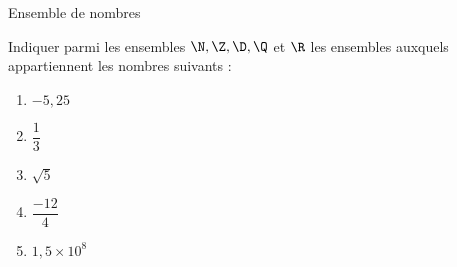 \documentclass[french,onlymath]{beamer}
\begin{document}
\begin{frame}{Ensemble de nombres}

Indiquer parmi les ensembles $\N, \Z, \D, \Q$ et $\R$ les ensembles auxquels appartiennent les nombres suivants :

\begin{enumerate}[\bf 1.]
\item $-5,25$

\item $\dfrac{1}{3}$

\item $\sqrt{5}$

\item $\dfrac{-12}{4}$

\item $1,5\times 10^8$

\end{enumerate}

\end{frame}


\end{document}
